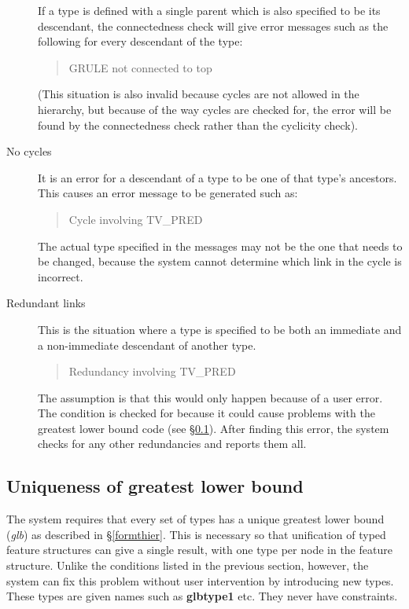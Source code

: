 \documentclass[12pt]{report}
\newenvironment{error}%
{\begin{quote}
\tt
}%
{\end{quote}
}
\begin{document}
\begin{description}
If a type is defined with a single parent which is also specified to be its 
descendant, the connectedness check will give error messages such as the
following for every descendant of the type:
\begin{error}
GRULE not connected to top
\end{error}
(This situation is also invalid because cycles are not allowed in the
hierarchy, but because of the way cycles are checked for, the error will be
found by the connectedness check rather than the cyclicity check).
\item[No cycles]
It is an error for a descendant of a type to be one of that type's ancestors.
This causes an error message to be generated such as:
\begin{error}
Cycle involving TV\_PRED
\end{error}
The actual type specified in the
messages may not be the one that needs to be changed,
because the system cannot determine which link in the cycle is incorrect.
\item[Redundant links] This is the situation where a type is
specified to be both an immediate and a non-immediate descendant of another type.
\begin{error}
Redundancy involving TV\_PRED
\end{error}
The assumption is that this would only happen because of a user error.
The condition is checked for because it could cause problems with the
greatest lower bound code (see \S\ref{glbgen}).
After finding this error, the system checks for any other redundancies
and reports them all.
\end{description}

\subsection{Uniqueness of greatest lower bound}
\label{glbgen}
  
The system requires that every set of types has a unique greatest lower bound
({\it glb})
as described in \S\ref{formthier}.  
This is necessary so that unification of typed feature structures
can give a single result, with one type per node in the feature structure.
Unlike the conditions listed in the previous section, however, the system can
fix this problem without user intervention by introducing new types.  These
types are given names such as {\bf glbtype1} etc.  They never have constraints.
\end{document}
